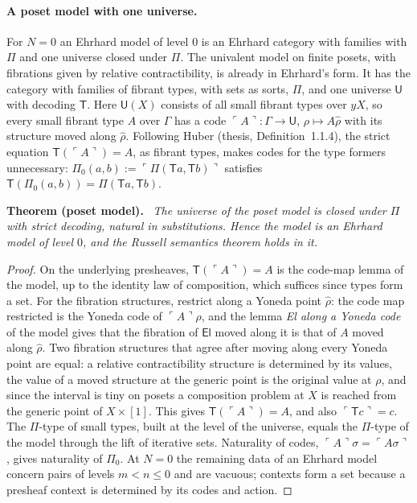 \documentclass[11pt]{article}
\newenvironment{theorem}[1]{\par\medskip\noindent\textbf{Theorem #1.}\ \itshape}{\par\medskip}
\theoremstyle{definition}
\theoremstyle{remark}
\newcommand{\U}{\mathsf U}
\newcommand{\T}{\mathsf T}
\newcommand{\code}[1]{\ulcorner #1\urcorner}
\begin{document}
\paragraph{A poset model with one universe.} For $N=0$ an Ehrhard
model of level $0$ is an Ehrhard category with families with $\Pi$ and one
universe closed under $\Pi$. The univalent model on finite posets, with
fibrations given by relative contractibility, is already in Ehrhard's form.
It has the category with families of fibrant types, with sets as sorts,
$\Pi$, and one universe $\U$ with decoding $\T$. Here $\U(X)$ consists of
all small fibrant types over $yX$, so every small fibrant type $A$ over
$\Gamma$ has a code $\code{A}:\Gamma\to\U$, $\rho\mapsto A\hat\rho$ with
its structure moved along $\hat\rho$. Following Huber (thesis,
Definition~1.1.4), the strict equation $\T(\code{A})=A$, as fibrant types,
makes codes for the type formers unnecessary: $\Pi_0(a,b):=\code{\Pi(\T
a,\T b)}$ satisfies $\T(\Pi_0(a,b))=\Pi(\T a,\T b)$.

\begin{theorem}{(poset model)}
The universe of the poset model is closed under $\Pi$ with strict
decoding, natural in substitutions. Hence the model is an Ehrhard model of
level $0$, and the Russell semantics theorem holds in it.
\end{theorem}
\begin{proof}
On the underlying presheaves, $\T(\code{A})=A$ is the code-map lemma of
the model, up to the identity law of composition, which suffices since
types form a set. For the fibration structures, restrict along a Yoneda
point $\hat\rho$: the code map restricted is the Yoneda code of
$\code{A}\rho$, and the lemma \emph{El along a Yoneda code} of the model
gives that the fibration of $\mathsf{El}$ moved along it is that of $A$
moved along $\hat\rho$. Two fibration structures that agree after moving
along every Yoneda point are equal: a relative contractibility structure
is determined by its values, the value of a moved structure at the generic
point is the original value at $\rho$, and since the interval is tiny on
posets a composition problem at $X$ is reached from the generic point of
$X\times[1]$. This gives $\T(\code{A})=A$, and also $\code{\T c}=c$. The
$\Pi$-type of small types, built at the level of the universe, equals the
$\Pi$-type of the model through the lift of iterative sets. Naturality of
codes, $\code{A}\sigma=\code{A\sigma}$, gives naturality of $\Pi_0$. At
$N=0$ the remaining data of an Ehrhard model concern pairs of levels
$m<n\le 0$ and are vacuous; contexts form a set because a presheaf context
is determined by its codes and action.
\end{proof}
\end{document}
